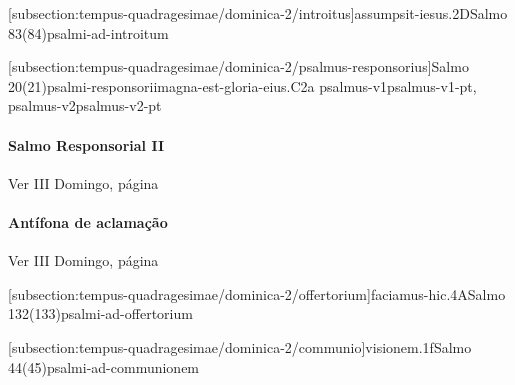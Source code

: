 \def\Prefix{subsection:tempus-quadragesimae/dominica-2}

[\Prefix/introitus]{assumpsit-iesus.2D}{Salmo 83(84)}{psalmi-ad-introitum}

\AllowPageFlush

[\Prefix/psalmus-responsorius]{Salmo 20(21)}{psalmi-responsorii}{magna-est-gloria-eius.C2a}{
  {psalmus-v1}{psalmus-v1-pt},
  {psalmus-v2}{psalmus-v2-pt}
}

\AllowPageFlush

\paragraph{Salmo Responsorial II}
\begin{rubrica}
  Ver III Domingo, página~\pageref{subsection:tempus-quadragesimae/dominica-3/psalmus-responsorius-2}
\end{rubrica}

\paragraph{Antífona de aclamação}
\begin{rubrica}
  Ver III Domingo, página~\pageref{subsection:tempus-quadragesimae/dominica-3/antiphona-acclamationis}
\end{rubrica}

[\Prefix/offertorium]{faciamus-hic.4A}{Salmo 132(133)}{psalmi-ad-offertorium}

\AllowPageFlush

[\Prefix/communio]{visionem.1f}{Salmo 44(45)}{psalmi-ad-communionem}